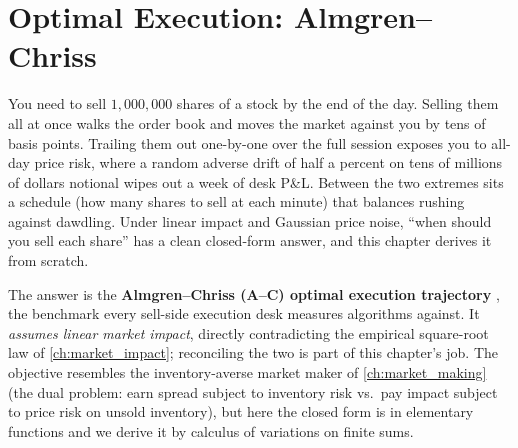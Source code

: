 \chapter{Optimal Execution: Almgren--Chriss}
\label{ch:almgren_chriss}

You need to sell $1{,}000{,}000$ shares of a stock by the end of the
day. Selling them all at once walks the order book and moves the
market against you by tens of basis points. Trailing them out
one-by-one over the full session exposes you to all-day price risk,
where a random adverse drift of half a percent on tens of millions
of dollars notional wipes out a week of desk P\&L. Between the two
extremes sits a schedule (how many shares to sell at each minute)
that balances rushing against dawdling. Under linear impact
and Gaussian price noise, ``when should you sell each share'' has
a clean closed-form answer, and this chapter derives it from scratch.

The answer is the \textbf{Almgren--Chriss (A--C) optimal execution
trajectory} \citeAC{}, the benchmark every sell-side execution desk
measures algorithms against. It \emph{assumes linear market impact},
directly contradicting the empirical square-root law of
\cref{ch:market_impact}; reconciling the two is part of this
chapter's job. The objective resembles the inventory-averse market
maker of \cref{ch:market_making} (the dual problem: earn spread
subject to inventory risk vs.\ pay impact subject to price risk on
unsold inventory), but here the closed form is in elementary
functions and we derive it by calculus of variations on finite sums.

